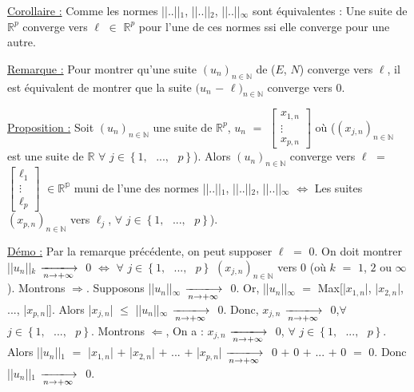 \documentclass{article}
\begin{document}
\parindent=0cm
\underline{Corollaire :} \parindent=1cm \smallbreak
Comme les normes ||..||$_1$, ||..||$_2$, ||..||$_{\infty}$ sont équivalentes : \smallbreak Une suite de $\mathbb{R}^p$ converge vers $\ell$ $\in$ $\mathbb{R}^p$ pour l'une de ces normes ssi elle converge pour une autre.

\parindent=0cm
\underline{Remarque :} \parindent=1cm \smallbreak
Pour montrer qu'une suite $(u_n)_{n \in \mathbb{N}}$ de ($E$, $N$) converge vers $\ell$, il est équivalent de montrer que \smallbreak la suite $(u_n$ $-$ $\ell)_{n \in \mathbb{N}}$ converge vers 0.

\parindent=0cm
\underline{Proposition :} \parindent=1cm \smallbreak
Soit $(u_n)_{n \in \mathbb{N}}$ une suite de $\mathbb{R}^p$, $u_n$ $=$ $
\begin{bmatrix}
	x_{1,n} \\
	\vdots \\
	x_{p,n}
\end{bmatrix}
$ où  ($(x_{j,n})_{n \in \mathbb{N}}$ est une suite de $\mathbb{R}$ $\forall$ $j \in \left\{ 1,\text{ }...,\text{ }p \right\} $). Alors \smallbreak $(u_n)_{n \in \mathbb{N}}$ converge vers $\ell$ $=$ $
\begin{bmatrix}
	\ell_1 \\
	\vdots \\
	\ell_p
\end{bmatrix}
$ $\in \mathbb{R^p}$ muni de l'une des normes ||..||$_1$, ||..||$_2$, ||..||$_{\infty}$ $\Longleftrightarrow$ Les suites $(x_{p,n})_{n \in \mathbb{N}}$ \smallbreak vers $\ell_j$, $\forall$ $j \in \left\{ 1,\text{ }...,\text{ }p \right\} $).

\parindent=0cm
\smallbreak
\underline{Démo :} \parindent=1cm \smallbreak Par la remarque précédente, on peut supposer $\ell$ $=$ $0$. On doit montrer ||$u_n$||$_k$ $\tendplusinf$ $0$ $\Longleftrightarrow$ \smallbreak $\forall$ $j \in \left\{ 1,\text{ }...,\text{ }p \right\} $  $(x_{j,n})_{n \in \mathbb{N}}$ vers $0$ (où $k$ $=$ $1$, $2$ ou $\infty$). Montrons $\Longrightarrow$. Supposons ||$u_n$||$_{\infty}$ $\tendplusinf$  $0$. Or, \smallbreak ||$u_n$||$_{\infty}$ $=$ Max[|$x_{1,n}$|, |$x_{2,n}$|, ..., |$x_{p,n}$|]. Alors |$x_{j,n}$| $\leqslant$ ||$u_n$||$_{\infty}$ $\tendplusinf$ $0$. Donc, $x_{j,n}$ $\tendplusinf$ $0$,\smallbreak $\forall$ $j \in \left\{ 1,\text{ }...,\text{ }p \right\} $.
\smallbreak
Montrons $\Longleftarrow$, On a : $x_{j,n}$ $\tendplusinf$ $0$,  $\forall$ $j \in \left\{ 1,\text{ }...,\text{ }p \right\} $. \smallbreak Alors ||$u_n$||$_1$ $=$ |$x_{1,n}$| $+$ |$x_{2,n}$| $+$ ... $+$ |$x_{p,n}$| $\tendplusinf$ $0$ $+$ $0$ $+$ ... $+$ $0$ $=$ $0$. Donc ||$u_n$||$_1$ $\tendplusinf$ $0$.
\end{document}
